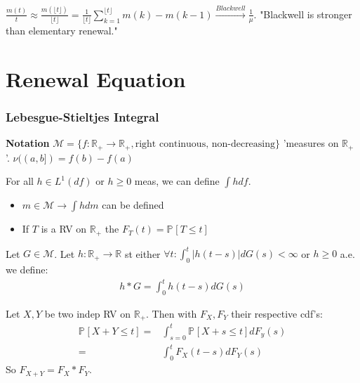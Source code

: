 \begin{rmk}[]
	$ \frac{m(t)}{t} \approx \frac{m(\lfloor t \rfloor)}{\lfloor t \rfloor} = \frac{1}{\lfloor t \rfloor} \sum_{k=1}^{\lfloor t \rfloor} m(k) - m(k-1) \stackrel{Blackwell}{\to} \frac{1}{\mu}$. "Blackwell is stronger than elementary renewal."
\end{rmk}

\section{Renewal Equation}

\subsubsection{Lebesgue-Stieltjes Integral} 
\textbf{Notation} $ \mathcal{M} = \{ f: \mathbb{R}_+ \to \mathbb{R}_+, \textrm{right continuous, non-decreasing}\}$ 'measures on $\mathbb{R}_+$ '. $\nu((a,b])=f(b)-f(a)$

For all $h \in L^1(df)$ or $h\geq 0$ meas, we can define $\int h df$.

\begin{ex}[]
\begin{itemize}
	\item $m \in \mathcal{M} \to \int h dm$ can be defined	
	\item If $T$ is a RV on $\mathbb{R}_+$ the $F_T(t) = \mathbb{P}_{} \left[ T \leq t \right] $
\end{itemize}

\end{ex}

\begin{defn}
	Let $G \in \mathcal{M}$. Let $h: \mathbb{R}_+ \to \mathbb{R}$ st either $\forall t: \int_{0}^{t}| h(t-s) | dG(s) < \infty $ or $h\geq 0$ a.e. we define:
\begin{align}
	h*G = \int_{0}^{t} h(t-s)dG(s)
\end{align}

\end{defn}

\begin{rmk}[]
	Let $X,Y$ be two indep RV on $\mathbb{R}_+$. Then with  $F_X, F_Y$ their respective cdf's: 
\begin{align}
	\mathbb{P}_{} \left[ X+Y \leq t \right] =& \int_{s=0}^{t} \mathbb{P}_{} \left[  X+s \leq t \right] dF_y(s) \\
	=& \int_{0}^{t} F_X(t-s)dF_Y(s)
\end{align}
So $F_{X+Y} = F_X * F_Y$.
\end{rmk}

